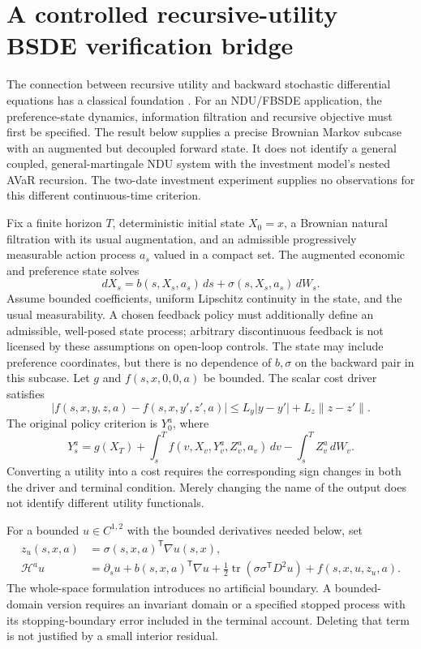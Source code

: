 \section{A controlled recursive-utility BSDE verification bridge}\label{supp:bridge109}
The connection between recursive utility and backward stochastic differential equations has a classical foundation \citep{PardouxPeng1990,ElKarouiPengQuenez1997}. For an NDU/FBSDE application, the preference-state dynamics, information filtration and recursive objective must first be specified. The result below supplies a precise Brownian Markov subcase with an augmented but decoupled forward state. It does not identify a general coupled, general-martingale NDU system with the investment model's nested AVaR recursion. The two-date investment experiment supplies no observations for this different continuous-time criterion.

Fix a finite horizon $T$, deterministic initial state $X_0=x$, a Brownian natural filtration with its usual augmentation, and an admissible progressively measurable action process $a_s$ valued in a compact set. The augmented economic and preference state solves
\[
 dX_s=b(s,X_s,a_s)\,ds+\sigma(s,X_s,a_s)\,dW_s.
\]
Assume bounded coefficients, uniform Lipschitz continuity in the state, and the usual measurability. A chosen feedback policy must additionally define an admissible, well-posed state process; arbitrary discontinuous feedback is not licensed by these assumptions on open-loop controls. The state may include preference coordinates, but there is no dependence of $b,\sigma$ on the backward pair in this subcase. Let $g$ and $f(s,x,0,0,a)$ be bounded. The scalar cost driver satisfies
\[
 |f(s,x,y,z,a)-f(s,x,y',z',a)|\le L_y|y-y'|+L_z\|z-z'\|.
\]
The original policy criterion is $Y_0^a$, where
\begin{equation}\label{eq:bsde109}
 Y_s^a=g(X_T)+\int_s^T f(v,X_v,Y_v^a,Z_v^a,a_v)\,dv
                  -\int_s^T Z_v^a\,dW_v.
\end{equation}
Converting a utility into a cost requires the corresponding sign changes in both the driver and terminal condition. Merely changing the name of the output does not identify different utility functionals.

For a bounded $u\in C^{1,2}$ with the bounded derivatives needed below, set
\begin{align*}
 z_u(s,x,a)&=\sigma(s,x,a)^{\mathsf T}\nabla u(s,x),\\
 \mathcal H^a u&=\partial_su+b(s,x,a)^{\mathsf T}\nabla u
 +\tfrac12\operatorname{tr}(\sigma\sigma^{\mathsf T}D^2u)
 +f(s,x,u,z_u,a).
\end{align*}
The whole-space formulation introduces no artificial boundary. A bounded-domain version requires an invariant domain or a specified stopped process with its stopping-boundary error included in the terminal account. Deleting that term is not justified by a small interior residual.

